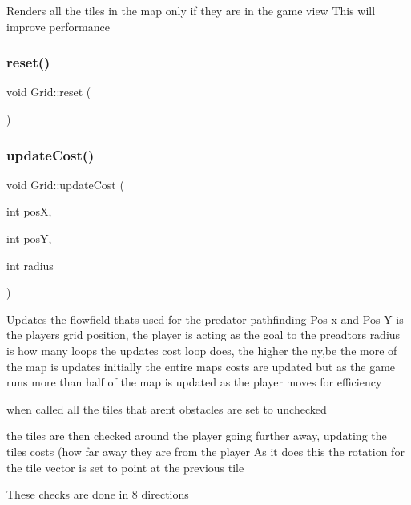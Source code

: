 Renders all the tiles in the map only if they are in the game view This will improve performance 

\mbox{\label{class_grid_a153095310e11b93d349d12f218b5e73e}} 
\subsubsection{\texorpdfstring{reset()}{reset()}}
{\footnotesize\ttfamily void Grid\+::reset (\begin{DoxyParamCaption}{ }\end{DoxyParamCaption})\hspace{0.3cm}{\ttfamily [private]}}





\mbox{\label{class_grid_ada7a1971d0a1a29d793eb76551d6e4fa}} 
\subsubsection{\texorpdfstring{updateCost()}{updateCost()}}
{\footnotesize\ttfamily void Grid\+::update\+Cost (\begin{DoxyParamCaption}\item[{int}]{posX,  }\item[{int}]{posY,  }\item[{int}]{radius }\end{DoxyParamCaption})}



Updates the flowfield thats used for the predator pathfinding Pos x and Pos Y is the players grid position, the player is acting as the goal to the preadtors radius is how many loops the updates cost loop does, the higher the ny,be the more of the map is updates initially the entire maps costs are updated but as the game runs more than half of the map is updated as the player moves for efficiency 

when called all the tiles that arent obstacles are set to unchecked

the tiles are then checked around the player going further away, updating the tiles costs (how far away they are from the player As it does this the rotation for the tile vector is set to point at the previous tile

These checks are done in 8 directions 


